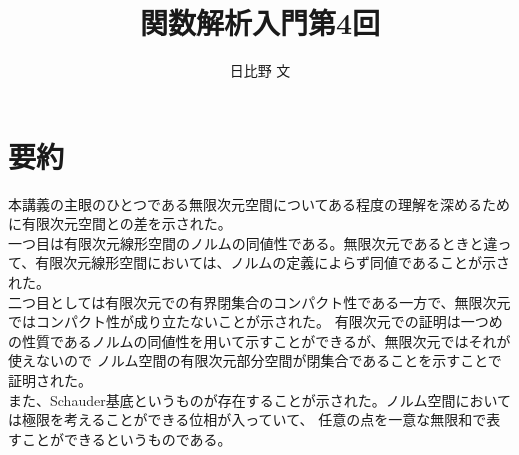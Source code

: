 \documentclass[12pt,a4paper]{ltjsarticle}
\begin{document}
\title{関数解析入門第4回}
\author{日比野 文}
\maketitle

\section{要約}
本講義の主眼のひとつである無限次元空間についてある程度の理解を深めるために有限次元空間との差を示された。\\
一つ目は有限次元線形空間のノルムの同値性である。無限次元であるときと違って、有限次元線形空間においては、ノルムの定義によらず同値であることが示された。\\
二つ目としては有限次元での有界閉集合のコンパクト性である一方で、無限次元ではコンパクト性が成り立たないことが示された。
有限次元での証明は一つめの性質であるノルムの同値性を用いて示すことができるが、無限次元ではそれが使えないので
ノルム空間の有限次元部分空間が閉集合であることを示すことで証明された。\\
また、Schauder基底というものが存在することが示された。ノルム空間においては極限を考えることができる位相が入っていて、
任意の点を一意な無限和で表すことができるというものである。\\
\end{document}
